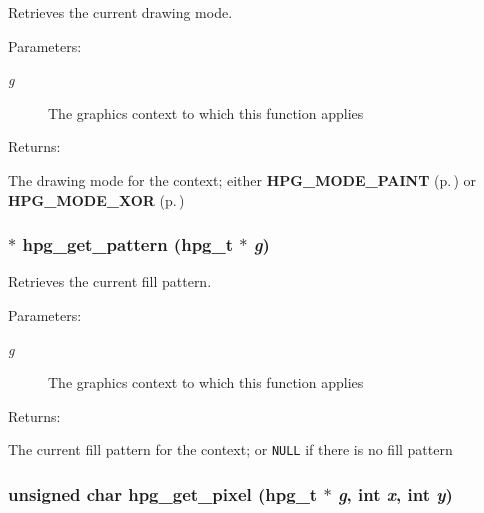 Retrieves the current drawing mode.

\begin{Desc}
\item[Parameters: ]\par
\begin{description}
\item[{\em 
g}]The graphics context to which this function applies \end{description}
\end{Desc}
\begin{Desc}
\item[Returns: ]\par
The drawing mode for the context; either {\bf HPG\_\-MODE\_\-PAINT} {\rm (p.\,\pageref{hpgraphics_8h_a0})} or {\bf HPG\_\-MODE\_\-XOR} {\rm (p.\,\pageref{hpgraphics_8h_a1})} \end{Desc}
\subsubsection{$\ast$ hpg\_\-get\_\-pattern ({\bf hpg\_\-t} $\ast$ {\em g})}\label{hpgraphics_8h_a66}


Retrieves the current fill pattern.

\begin{Desc}
\item[Parameters: ]\par
\begin{description}
\item[{\em 
g}]The graphics context to which this function applies \end{description}
\end{Desc}
\begin{Desc}
\item[Returns: ]\par
The current fill pattern for the context; or {\tt NULL} if there is no fill pattern \end{Desc}
\subsubsection{\setlength{\rightskip}{0pt plus 5cm}unsigned char hpg\_\-get\_\-pixel ({\bf hpg\_\-t} $\ast$ {\em g}, int {\em x}, int {\em y})}\label{hpgraphics_8h_a74}


